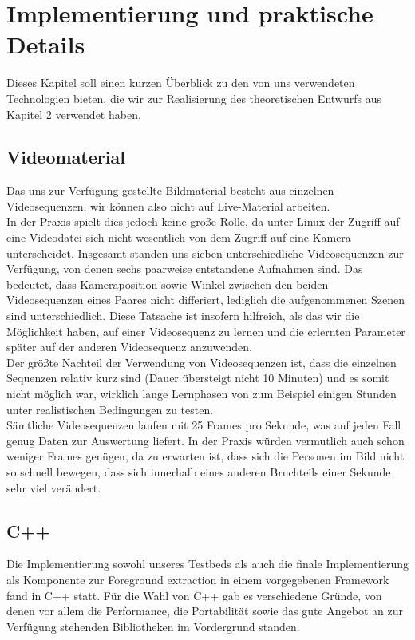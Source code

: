 \chapter{Implementierung und praktische Details}

Dieses Kapitel soll einen kurzen Überblick zu den von uns verwendeten Technologien bieten, die wir zur Realisierung des theoretischen Entwurfs aus Kapitel 2 verwendet haben.


\section{Videomaterial}
Das uns zur Verfügung gestellte Bildmaterial besteht aus einzelnen Videosequenzen, wir können also nicht auf Live-Material arbeiten.\\

In der Praxis spielt dies jedoch keine große Rolle, da unter Linux der Zugriff auf eine Videodatei sich nicht wesentlich von dem Zugriff auf eine Kamera unterscheidet.
Insgesamt standen uns sieben unterschiedliche Videosequenzen zur Verfügung, von denen sechs paarweise entstandene Aufnahmen sind.
 Das bedeutet, dass Kameraposition sowie Winkel zwischen den beiden Videosequenzen eines Paares nicht differiert, lediglich die aufgenommenen Szenen sind unterschiedlich.
 Diese Tatsache ist insofern hilfreich, als das wir die Möglichkeit haben, auf einer Videosequenz zu lernen und die erlernten Parameter später auf der anderen Videosequenz anzuwenden.\\

Der größte Nachteil der Verwendung von Videosequenzen ist, dass die einzelnen Sequenzen relativ kurz sind (Dauer übersteigt nicht 10 Minuten) und es somit nicht möglich war, wirklich lange Lernphasen von zum Beispiel einigen Stunden unter realistischen Bedingungen zu testen.\\

Sämtliche Videosequenzen laufen mit 25 Frames pro Sekunde, was auf jeden Fall genug Daten zur Auswertung liefert.
 In der Praxis würden vermutlich auch schon weniger Frames genügen, da zu erwarten ist, dass sich die Personen im Bild nicht so schnell bewegen, dass sich innerhalb eines anderen Bruchteils einer Sekunde sehr viel verändert.

\section{C++}
Die Implementierung sowohl unseres Testbeds als auch die finale Implementierung als Komponente zur Foreground extraction in einem vorgegebenen Framework fand in C++ statt.
 Für die Wahl von C++ gab es verschiedene Gründe, von denen vor allem die Performance, die Portabilität sowie das gute Angebot an zur Verfügung stehenden Bibliotheken im Vordergrund standen.


